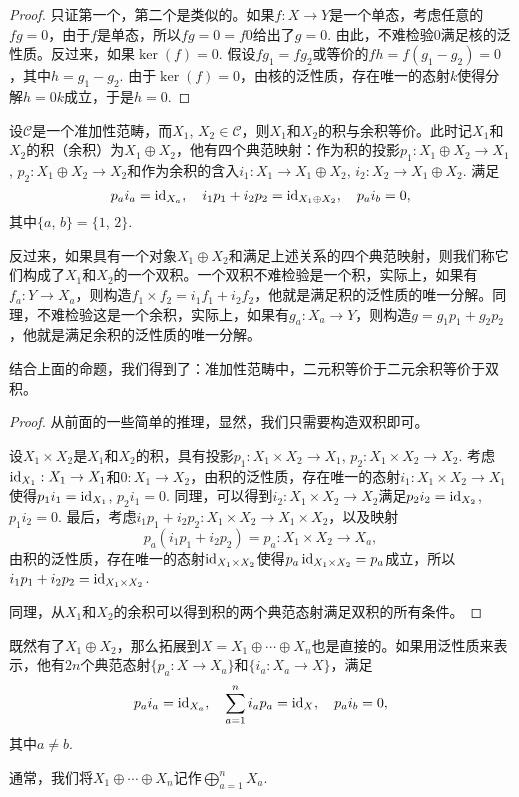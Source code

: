 \begin{proof}
只证第一个，第二个是类似的。如果$f:X\to Y$是一个单态，考虑任意的$fg=0$，由于$f$是单态，所以$fg=0=f0$给出了$g=0$. 由此，不难检验$0$满足核的泛性质。反过来，如果$\ker(f)=0$. 假设$fg_1=fg_2$或等价的$fh=f(g_1-g_2)=0$，其中$h=g_1-g_2$. 由于$\ker(f)=0$，由核的泛性质，存在唯一的态射$k$使得分解$h=0k$成立，于是$h=0$.
\end{proof}

\begin{pro}
设$\mathcal{C}$是一个准加性范畴，而$X_1$, $X_2\in \mathcal{C}$，则$X_1$和$X_2$的积与余积等价。此时记$X_1$和$X_2$的积（余积）为$X_1\oplus X_2$，他有四个典范映射：作为积的投影$p_1:X_1\oplus X_2\to X_1$, $p_2:X_1\oplus X_2\to X_2$和作为余积的含入$i_1:X_1\to X_1\oplus X_2$, $i_2:X_2\to X_1\oplus X_2$. 满足
\[
	p_ai_a=\operatorname{id}_{X_a},\quad i_1p_1+i_2p_2=\operatorname{id}_{X_1\oplus X_2},\quad p_ai_b=0,
\]
其中$\{a$, $b\}=\{1$, $2\}$. 
\end{pro}

反过来，如果具有一个对象$X_1\oplus X_2$和满足上述关系的四个典范映射，则我们称它们构成了$X_1$和$X_2$的一个双积。一个双积不难检验是一个积，实际上，如果有$f_a:Y\to X_a$，则构造$f_1\times f_2=i_1f_1+i_2f_2$，他就是满足积的泛性质的唯一分解。同理，不难检验这是一个余积，实际上，如果有$g_a:X_a\to Y$，则构造$g=g_1p_1+g_2p_2$，他就是满足余积的泛性质的唯一分解。

结合上面的命题，我们得到了：准加性范畴中，二元积等价于二元余积等价于双积。

\begin{proof}
从前面的一些简单的推理，显然，我们只需要构造双积即可。

设$X_1\times X_2$是$X_1$和$X_2$的积，具有投影$p_1:X_1\times X_2\to X_1$, $p_2:X_1\times X_2\to X_2$. 考虑$\operatorname{id}_{X_1}:X_1\to X_1$和$0:X_1\to X_2$，由积的泛性质，存在唯一的态射$i_1:X_1\times X_2 \to X_1$使得$p_1i_1=\operatorname{id}_{X_1}$, $p_2i_1=0$. 同理，可以得到$i_2:X_1\times X_2 \to X_2$满足$p_2i_2=\operatorname{id}_{X_2}$, $p_1i_2=0$. 最后，考虑$i_1p_1+i_2p_2:X_1\times X_2\to X_1\times X_2$，以及映射
\[
	p_a(i_1p_1+i_2p_2)=p_a:X_1\times X_2\to X_a,
\]
由积的泛性质，存在唯一的态射$\operatorname{id}_{X_1\times X_2}$使得$p_a\operatorname{id}_{X_1\times X_2}=p_a$成立，所以$i_1p_1+i_2p_2=\operatorname{id}_{X_1\times X_2}$.

同理，从$X_1$和$X_2$的余积可以得到积的两个典范态射满足双积的所有条件。
\end{proof}

\begin{para}
既然有了$X_1\oplus X_2$，那么拓展到$X=X_1\oplus \cdots \oplus X_n$也是直接的。如果用泛性质来表示，他有$2n$个典范态射$\{p_a:X\to X_a\}$和$\{i_a:X_a\to X\}$，满足
\[
	p_ai_a=\operatorname{id}_{X_a},\quad \sum_{a=1}^n i_ap_a=\operatorname{id}_{X},\quad p_ai_b=0,
\]
其中$a\neq b$.

通常，我们将$X_1\oplus \cdots \oplus X_n$记作$\bigoplus_{a=1}^nX_a$.
\end{para}

